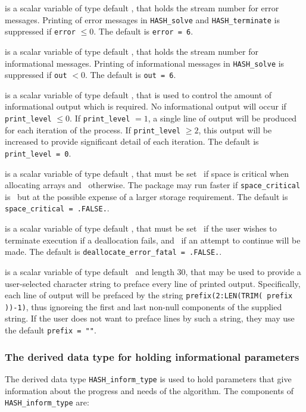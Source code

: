 \documentclass{galahad}
\newcommand{\packagename}{HASH}
\begin{document}
\begin{description}

 is a scalar variable of type default \integer, that holds the
stream number for error messages. Printing of error messages in
{\tt \packagename\_solve} and {\tt \packagename\_terminate}
is suppressed if {\tt error} $\leq 0$.
The default is {\tt error = 6}.

 is a scalar variable of type default \integer, that holds the
stream number for informational messages. Printing of informational messages in
{\tt \packagename\_solve} is suppressed if {\tt out} $< 0$.
The default is {\tt out = 6}.

 is a scalar variable of type default \integer, that is used
to control the amount of informational output which is required. No
informational output will occur if {\tt print\_level} $\leq 0$. If
{\tt print\_level} $= 1$, a single line of output will be produced for each
iteration of the process. If {\tt print\_level} $\geq 2$, this output will be
increased to provide significant detail of each iteration.
The default is {\tt print\_level = 0}.

 is a scalar variable of type default \logical,
that must be set \true\ if space is critical when allocating arrays
and  \false\ otherwise. The package may run faster if
{\tt space\_critical} is \false\ but at the possible expense of a larger
storage requirement. The default is {\tt space\_critical = .FALSE.}.

 is a scalar variable of type default \logical,
that must be set \true\ if the user wishes to terminate execution if
a deallocation  fails, and \false\ if an attempt to continue
will be made. The default is {\tt deallocate\_error\_fatal = .FALSE.}.

 is a scalar variable of type default \character\
and length 30, that may be used to provide a user-selected
character string to preface every line of printed output.
Specifically, each line of output will be prefaced by the string
{\tt prefix(2:LEN(TRIM( prefix ))-1)},
thus ignoreing the first and last non-null components of the
supplied string. If the user does not want to preface lines by such
a string, they may use the default {\tt prefix = ""}.

\end{description}


\subsubsection{The derived data type for holding informational
 parameters}\label{typeinform}
The derived data type
{\tt \packagename\_inform\_type}
is used to hold parameters that give information about the progress and needs
of the algorithm. The components of
{\tt \packagename\_inform\_type}
are:
\end{document}
